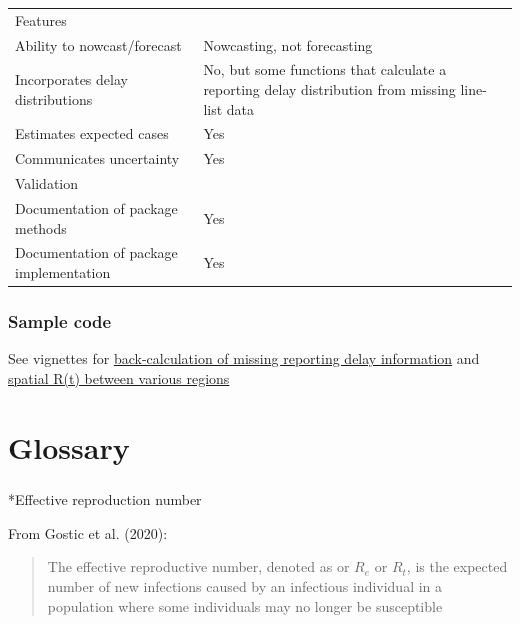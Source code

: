 \documentclass[
  letterpaper,
  DIV=11,
  numbers=noendperiod]{scrreprt}
\makeatletter
\let\oldparagraph\paragraph
\renewcommand{\paragraph}{
    \@ifstar
      \xxxParagraphStar
      \xxxParagraphNoStar
  }
\newcommand{\xxxParagraphStar}[1]{\oldparagraph*{#1}\mbox{}}
\newcommand{\xxxParagraphNoStar}[1]{\oldparagraph{#1}\mbox{}}
\makeatother
\begin{document}
\begin{longtable}[]{@{}
  >{\raggedright\arraybackslash}p{}
  >{\raggedright\arraybackslash}p{}@{}}
\toprule\noalign{}
\endhead
\bottomrule\noalign{}
\endlastfoot
Features & \\
Ability to nowcast/forecast & Nowcasting, not forecasting \\
Incorporates delay distributions & No, but some functions that calculate
a reporting delay distribution from missing line-list data \\
Estimates expected cases & Yes \\
Communicates uncertainty & Yes \\
Validation & \\
Documentation of package methods & Yes \\
Documentation of package implementation & Yes \\
\end{longtable}

\subsection*{Sample code}\label{sample-code-12}

See vignettes for
\href{https://cran.r-project.org/web/packages/WhiteLabRt/vignettes/backcalc.html}{back-calculation
of missing reporting delay information} and
\href{https://cran.r-project.org/web/packages/WhiteLabRt/vignettes/spatialRt.html}{spatial
R(t) between various regions}


\chapter*{Glossary}\label{glossary}


\paragraph*{Effective reproduction number}\label{effectiveRt}

From Gostic et al. (2020):

\begin{quote}
The effective reproductive number, denoted as or \(R_e\) or \(R_t\), is
the expected number of new infections caused by an infectious individual
in a population where some individuals may no longer be susceptible
\end{quote}
\end{document}
